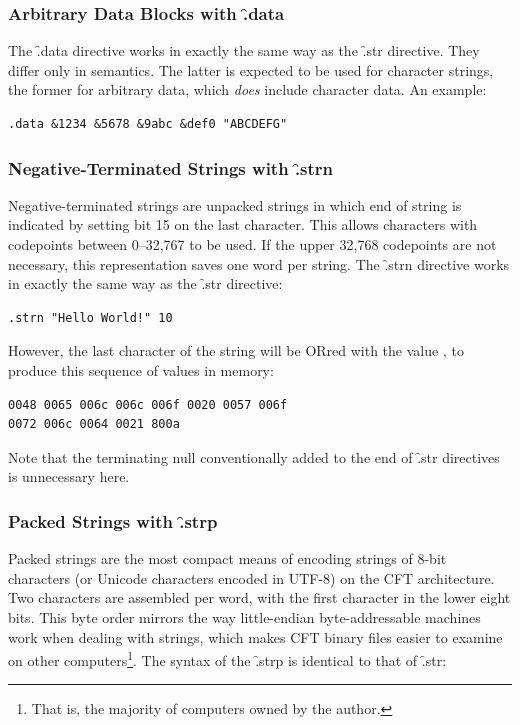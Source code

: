 \subsubsection{Arbitrary Data Blocks with \f{.data}}

The \f{.data} directive works in exactly the same way as the \f{.str}
directive. They differ only in semantics. The latter is expected to be used for
character strings, the former for arbitrary data, which {\em does\/} include
character data. An example:

\begin{lstlisting}[language=cftasm,numbers=none]
.data &1234 &5678 &9abc &def0 "ABCDEFG"
\end{lstlisting}

\subsubsection{Negative-Terminated Strings with \f{.strn}}

Negative-terminated strings are unpacked strings in which end of string is
indicated by setting bit 15 on the last character. This allows characters with
codepoints between 0–32,767 to be used. If the upper 32,768 codepoints are not
necessary, this representation saves one word per string. The \f{.strn}
directive works in exactly the same way as the \f{.str} directive:

\begin{lstlisting}[language=cftasm,numbers=none]
.strn "Hello World!" 10
\end{lstlisting}

However, the last character of the string will be ORred with the value
, to produce this sequence of values in memory:

\begin{lstlisting}[numbers=none]
0048 0065 006c 006c 006f 0020 0057 006f
0072 006c 0064 0021 800a
\end{lstlisting}

Note that the terminating null conventionally added to the end of \f{.str}
directives is unnecessary here.



\subsubsection{Packed Strings with \f{.strp}}
\label{sec:asm-pstring}

Packed strings are the most compact means of encoding strings of 8-bit
characters (or Unicode characters encoded in UTF-8) on the CFT
architecture. Two characters are assembled per word, with the first character
in the lower eight bits. This byte order mirrors the way little-endian
byte-addressable machines work when dealing with strings, which makes CFT
binary files easier to examine on other computers\footnote{That is, the
  majority of computers owned by the author.}. The syntax of the \f{.strp} is
identical to that of \f{.str}:

